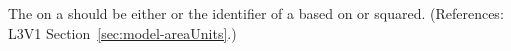 The  on a \Model should be either
 or the identifier of a \UnitDefinition based
on  or  squared.  
(References: L3V1 Section~\ref{sec:model-areaUnits}.)
